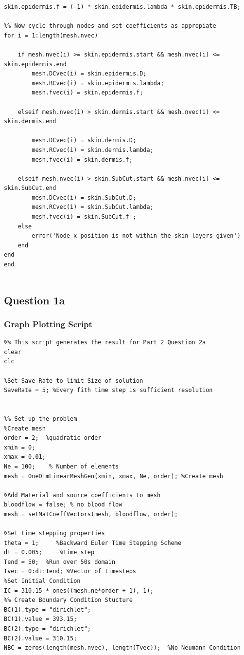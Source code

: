 \documentclass[11pt]{article}
\begin{document}
\begin{appendices}
\begin{lstlisting}
skin.epidermis.f = (-1) * skin.epidermis.lambda * skin.epidermis.TB;

%% Now cycle through nodes and set coefficients as appropiate
for i = 1:length(mesh.nvec)
    
    if mesh.nvec(i) >= skin.epidermis.start && mesh.nvec(i) <= skin.epidermis.end
        mesh.DCvec(i) = skin.epidermis.D;
        mesh.RCvec(i) = skin.epidermis.lambda;
        mesh.fvec(i) = skin.epidermis.f;
        
    elseif mesh.nvec(i) > skin.dermis.start && mesh.nvec(i) <= skin.dermis.end
        
        mesh.DCvec(i) = skin.dermis.D;
        mesh.RCvec(i) = skin.dermis.lambda;
        mesh.fvec(i) = skin.dermis.f;
        
    elseif mesh.nvec(i) > skin.SubCut.start && mesh.nvec(i) <= skin.SubCut.end
        mesh.DCvec(i) = skin.SubCut.D;
        mesh.RCvec(i) = skin.SubCut.lambda;
        mesh.fvec(i) = skin.SubCut.f ;
    else
        error('Node x position is not within the skin layers given')
    end
end
end


\end{lstlisting}
\pagebreak

\subsection{Question 1a }
\subsubsection{Graph Plotting Script}
\begin{lstlisting}
%% This script generates the result for Part 2 Question 2a
clear
clc

%Set Save Rate to limit Size of solution
SaveRate = 5; %Every fith time step is sufficient resolution


%% Set up the problem
%Create mesh
order = 2;  %quadratic order
xmin = 0;
xmax = 0.01;
Ne = 100;    % Number of elements
mesh = OneDimLinearMeshGen(xmin, xmax, Ne, order); %Create mesh

%Add Material and source coefficients to mesh
bloodflow = false; % no blood flow
mesh = setMatCoeffVectors(mesh, bloodflow, order); 

%Set time stepping properties
theta = 1;     %Backward Euler Time Stepping Scheme
dt = 0.005;     %Time step
Tend = 50;  %Run over 50s domain
Tvec = 0:dt:Tend; %Vector of timesteps
%Set Initial Condition
IC = 310.15 * ones((mesh.ne*order + 1), 1);
%% Create Boundary Condition Stucture
BC(1).type = "dirichlet";
BC(1).value = 393.15;
BC(2).type = "dirichlet";
BC(2).value = 310.15;
NBC = zeros(length(mesh.nvec), length(Tvec));  %No Neumann Condition


\end{lstlisting}
\end{appendices}
\end{document}
